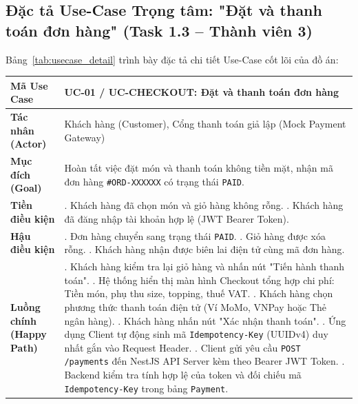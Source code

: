 \documentclass[a4paper]{article}
\begin{document}
\newpage
\subsection{Đặc tả Use-Case Trọng tâm: "Đặt và thanh toán đơn hàng" (Task 1.3 -- Thành viên 3)}
Bảng~\ref{tab:usecase_detail} trình bày đặc tả chi tiết Use-Case cốt lõi của đồ án:

\begin{table}[H]
\centering
\footnotesize
\begin{tabular}{|>{\raggedright\arraybackslash}p{3.4cm}|>{\raggedright\arraybackslash}p{12.2cm}|}
\hline
\textbf{Mã Use Case} & \textbf{UC-01 / UC-CHECKOUT: Đặt và thanh toán đơn hàng} \\ \hline
\textbf{Tác nhân (Actor)} & Khách hàng (Customer), Cổng thanh toán giả lập (Mock Payment Gateway) \\ \hline
\textbf{Mục đích (Goal)} & Hoàn tất việc đặt món và thanh toán không tiền mặt, nhận mã đơn hàng \texttt{\#ORD-XXXXXX} có trạng thái \texttt{PAID}. \\ \hline
\textbf{Tiền điều kiện} & 1. Khách hàng đã chọn món và giỏ hàng không rỗng. \newline 2. Khách hàng đã đăng nhập tài khoản hợp lệ (JWT Bearer Token). \\ \hline
\textbf{Hậu điều kiện} & 1. Đơn hàng chuyển sang trạng thái \texttt{PAID}. \newline 2. Giỏ hàng được xóa rỗng. \newline 3. Khách hàng nhận được biên lai điện tử cùng mã đơn hàng. \\ \hline
\textbf{Luồng chính (Happy Path)} & 
1. Khách hàng kiểm tra lại giỏ hàng và nhấn nút "Tiến hành thanh toán". \newline
2. Hệ thống hiển thị màn hình Checkout tổng hợp chi phí: Tiền món, phụ thu size, topping, thuế VAT. \newline
3. Khách hàng chọn phương thức thanh toán điện tử (Ví MoMo, VNPay hoặc Thẻ ngân hàng). \newline
4. Khách hàng nhấn nút "Xác nhận thanh toán". \newline
5. Ứng dụng Client tự động sinh mã \texttt{Idempotency-Key} (UUIDv4) duy nhất gắn vào Request Header. \newline
6. Client gửi yêu cầu \texttt{POST /payments} đến NestJS API Server kèm theo Bearer JWT Token. \newline
7. Backend kiểm tra tính hợp lệ của token và đối chiếu mã \texttt{Idempotency-Key} trong bảng \texttt{Payment}. \newline

\end{tabular}
\end{table}
\end{document}
